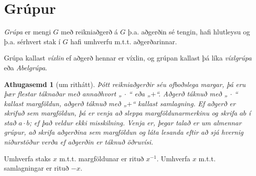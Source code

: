 \documentclass[a4paper,icelandic,11pt]{book}
\theoremstyle{plain}
\newtheorem*{ath}{Athugasemd}
\begin{document}
\section{Grúpur}
\begin{skilgr}
  \emph{Grúpa} er mengi $G$ með reikniaðgerð á $G$ þ.a. aðgerðin sé
  tengin, hafi hlutleysu og þ.a. sérhvert stak í $G$ hafi umhverfu m.t.t.
  aðgerðarinnar.

  Grúpa kallast \emph{víxlin}
  ef aðgerð hennar er víxlin, og grúpan kallast þá
  líka \emph{víxlgrúpa} eða 
  \emph{Abelgrúpa}.
\end{skilgr}
\begin{ath}
  [um rithátt]
  Þótt reikniaðgerðir séu ofboðslega margar, þá eru þær flestar táknaðar með
  annaðhvort „ $\cdot$ “ eða „$+$“. Aðgerð táknuð með „ $\cdot$ “ kallast
  \emph{margföldun}, aðgerð táknuð með „$+$“ kallast 
  \emph{samlagning}. Ef
  aðgerð er skrifuð sem margföldun, þá er venja að sleppa margföldunarmerkinu
  og skrifa $ab$ í stað $a\cdot b$; \emph{ef} það veldur ekki misskilning.
  Venja er, þegar talað er um almennar grúpur, að skrifa aðgerðina sem
  margföldun og láta lesanda eftir að sjá hvernig niðurstöður verða ef
  aðgerðin er táknuð öðruvísi.
\end{ath}
Umhverfa staks $x$
m.t.t. margföldunar er rituð $x^{-1}$. 
Umhverfa $x$ m.t.t.
samlagningar er rituð $-x$.
\end{document}
